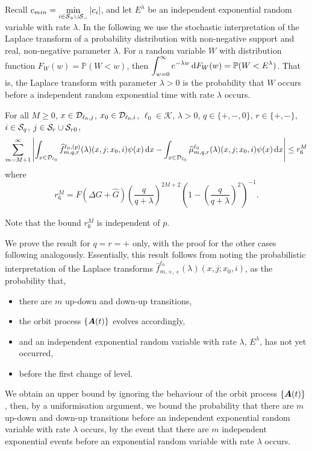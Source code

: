 Recall \(c_{min} = \min\limits_{i\in\mathcal S_{+}\cup\mathcal{S}_-} |c_i|\), and let \(E^\lambda\) be an independent exponential random variable with rate \(\lambda\). In the following we use the stochastic interpretation of the Laplace transform of a probability distribution with non-negative support and real, non-negative parameter \(\lambda\). For a random variable \(W\) with distribution function \(F_W(w)= \mathbb P(W<w)\), then \(\displaystyle\int_{w=0}^\infty e^{-\lambda w} \, \mathrm{d} F_W(w) = \mathbb P(W < E^{\lambda})\). That is, the Laplace transform with parameter \(\lambda >0\) is the probability that \(W\) occurs before a independent random exponential time with rate \(\lambda\) occurs. 
\begin{lem}\label{lem: gkjljklgagjklagsjlk}For all \(M\geq 0\), \(x\in\mathcal{D}_{\ell_0,j}\), \(x_0\in\mathcal{D}_{\ell_0,i}\), \(\ell_0\in\mathcal K\), \(\lambda > 0\), \(q\in\{+,-,0\}\), \(r\in\{+,-\}\), \(i\in\mathcal{S}_q\), \(j\in\mathcal{S}_r\cup\mathcal{S}_{r0}\),
	\begin{align}
		\sum_{m=M+1}^\infty \left| \int_{x\in\mathcal{D}_{\ell_0}} \widehat f^{\ell_0,(p)}_{m,q,r}(\lambda)(x,j;x_0,i)\psi(x)\, \mathrm{d} x
		-
		\int_{x\in\mathcal{D}_{\ell_0}} \widehat \mu^{\ell_0}_{m,q,r}(\lambda)(x,j;x_0,i)\psi(x) \, \mathrm{d} x\right| \leq r_6^M
	\end{align} 
	where 
	\[r_6^M =  F(\Delta G + \widehat G)\left(\frac{q}{q+\lambda}\right)^{2M+2} \left(1-\left(\frac{q}{q+\lambda}\right)^2\right)^{-1} .\]
\end{lem}
Note that the bound \(r_6^M\) is independent of \(p\). 

We prove the result for \(q=r=+\) only, with the proof for the other cases following analogously. Essentially, this result follows from noting the probabilistic interpretation of the Laplace transforms \(\widehat f^{\ell_0}_{m,+,+}(\lambda)(x,j;x_0,i)\), as the probability that, 
\begin{itemize}
	\item there are \(m\) up-down and down-up transitions, 
	\item the orbit process \(\{\boldsymbol A(t)\}\) evolves accordingly, 
	\item and an independent exponential random variable with rate \(\lambda\), \(E^\lambda\), has not yet occurred,
	\item before the first change of level.
\end{itemize}
We obtain an upper bound by ignoring the behaviour of the orbit process \(\{\boldsymbol A(t)\}\), then, by a uniformisation argument, we bound the probability that there are \(m\) up-down and down-up transitions before an independent exponential random variable with rate \(\lambda\) occurs, by the event that there are \(m\) independent exponential events before an exponential random variable with rate \(\lambda\) occurs.

